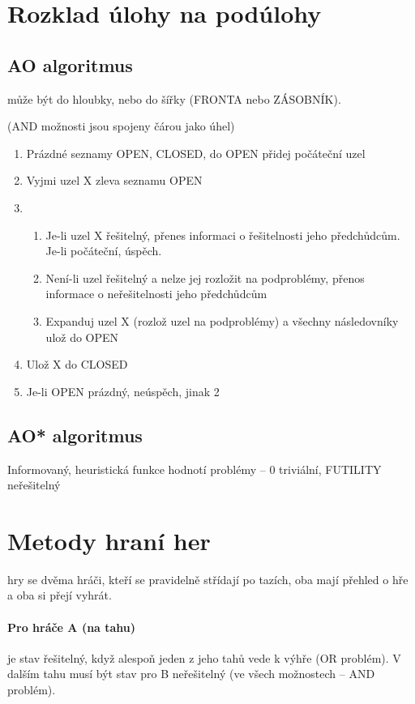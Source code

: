 \documentclass[a4paper, 11pt]{report}
\begin{document}
\section{Rozklad úlohy na podúlohy}

\subsection{AO algoritmus} může být do hloubky, nebo do šířky (FRONTA nebo ZÁSOBNÍK).

(AND možnosti jsou spojeny čárou jako úhel)

\begin{enumerate}
	\item Prázdné seznamy OPEN, CLOSED, do OPEN přidej počáteční uzel
	\item Vyjmi uzel X zleva seznamu OPEN
	\item
	\begin{enumerate}
		\item Je-li uzel X řešitelný, přenes informaci o řešitelnosti jeho předchůdcům. Je-li počáteční, úspěch.
		\item Není-li uzel řešitelný a nelze jej rozložit na podproblémy, přenos informace o neřešitelnosti jeho předchůdcům
		\item Expanduj uzel X (rozlož uzel na podproblémy) a všechny následovníky ulož do OPEN
	\end{enumerate}
	\item Ulož X do CLOSED
	\item Je-li OPEN prázdný, neúspěch, jinak 2
\end{enumerate}

\subsection{AO* algoritmus}
Informovaný, heuristická funkce hodnotí problémy -- 0 triviální, FUTILITY neřešitelný

\section{Metody hraní her}

hry se dvěma hráči, kteří se pravidelně střídají po tazích, oba mají přehled o hře a oba si přejí vyhrát.

\paragraph{Pro hráče A (na tahu)} je stav řešitelný, když alespoň jeden z jeho tahů vede k výhře (OR problém). V dalším tahu musí být stav pro B neřešitelný (ve všech možnostech -- AND problém).
\end{document}
